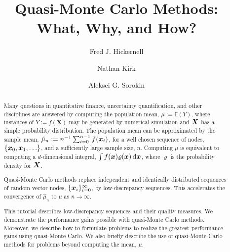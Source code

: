 \documentclass{svproc}
\begin{document}
\mainmatter              %
%
\title{Quasi-Monte Carlo Methods:  What, Why, and How?}
%
%
\author{Fred J. Hickernell \and Nathan Kirk \and Aleksei G. Sorokin}
%
%
%



\maketitle              %

\begin{abstract}
Many questions in  quantitative finance, uncertainty quantification, and other disciplines are answered by computing the population mean, $\mu := \mathbb{E}(Y)$, where instances of $Y:=f(\boldsymbol{X})$ may be generated by numerical simulation and ${\boldsymbol{X}}$ has a simple probability  distribution. The population mean can be approximated by the sample mean, $\hat{\mu}_n := n^{-1} \sum_{i=0}^{n-1} f({\boldsymbol{x}}_i)$, for a well chosen sequence of nodes, $\{{\boldsymbol{x}}_0, {\boldsymbol{x}}_1, \ldots\}$, and a sufficiently large sample size, $n$.  Computing $\mu$ is equivalent to computing a $d$-dimensional integral, $\int f({\boldsymbol{x}}) \varrho({\boldsymbol{x}}) \, \mathrm{d} {\boldsymbol{x}}$, where $\varrho$ is the probability density for ${\boldsymbol{X}}$.

Quasi-Monte Carlo methods replace independent and identically distributed  sequences of random vector nodes, $\{{\boldsymbol{x}}_i \}_{i = 0}^{\infty}$, by low-discrepancy sequences.  This accelerates the convergence of $\hat{\mu}_n$ to $\mu$ as $n \to \infty$.

This tutorial describes  low-discrepancy sequences  and their quality measures.  We demonstrate the performance gains possible with quasi-Monte Carlo methods.  Moreover, we describe how to formulate problems to realize the greatest performance gains using quasi-Monte Carlo.  We also briefly describe the use of quasi-Monte Carlo methods for problems beyond computing the mean, $\mu$.

\end{abstract}
%
\setcounter{tocdepth}{2}
\end{document}
